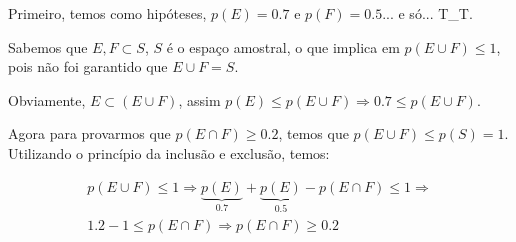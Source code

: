 \item
Primeiro, temos como hipóteses, $p(E)=0.7$ e $p(F)=0.5$... e só... T\_T.

Sabemos que $E, F \subset S$, $S$ é o espaço amostral, o que implica
em $p(E \cup F) \le 1$, pois não foi garantido que $E \cup F = S$.

Obviamente, $E \subset (E \cup F)$, assim $p(E) \le p(E \cup F) \Rightarrow 0.7 \le p(E \cup F)$.

Agora para provarmos que $p(E \cap F) \ge 0.2$, temos que $p(E \cup F) \le p(S) = 1$.
Utilizando o princípio da inclusão e exclusão, temos:

\[\begin{array}{l}
p(E \cup F) \le 1 \Rightarrow \underbrace {p(E)}_{0.7} + \underbrace {p(E)}_{0.5} - p(E \cap F) \le 1 \Rightarrow \\
1.2 - 1 \le p(E \cap F) \Rightarrow p(E \cap F) \ge 0.2
\end{array}\]

